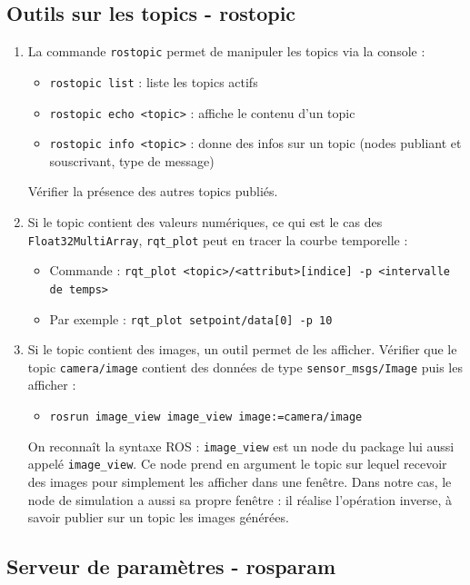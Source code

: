 \documentclass[12pt,a4paper]{article}
\begin{document}
\subsection{Outils sur les topics - rostopic}
\begin{enumerate}

\item La commande \texttt{rostopic} permet de manipuler les topics via la console :
\begin{itemize}
\item \texttt{rostopic list} : liste les topics actifs
\item \texttt{rostopic echo <topic>} : affiche le contenu d'un topic
\item \texttt{rostopic info <topic>} : donne des infos sur un topic (nodes publiant et souscrivant, type de message)
\end{itemize}
Vérifier la présence des autres topics publiés.
\item Si le topic contient des valeurs numériques, ce qui est le cas des \texttt{Float32MultiArray}, \texttt{rqt\_plot} peut en tracer la courbe temporelle : 
\begin{itemize}
\item Commande : \texttt{rqt\_plot <topic>/<attribut>[indice] -p <intervalle de temps>}
\item Par exemple : \texttt{rqt\_plot setpoint/data[0] -p 10}
\end{itemize}
\item Si le topic contient des images, un outil permet de les afficher. Vérifier que le topic \texttt{camera/image} contient des données de type \texttt{sensor\_msgs/Image} puis les afficher :
\begin{itemize}
\item \texttt{rosrun image\_view image\_view image:=camera/image}
\end{itemize}
On reconnaît la syntaxe ROS : \texttt{image\_view} est un node du package lui aussi appelé \texttt{image\_view}. Ce node prend en argument le topic sur lequel recevoir des images pour simplement les afficher dans une fenêtre. Dans notre cas, le node de simulation a aussi sa propre fenêtre : il réalise l'opération inverse, à savoir publier sur un topic les images générées.
\end{enumerate}

\subsection{Serveur de paramètres - rosparam}
\end{document}
